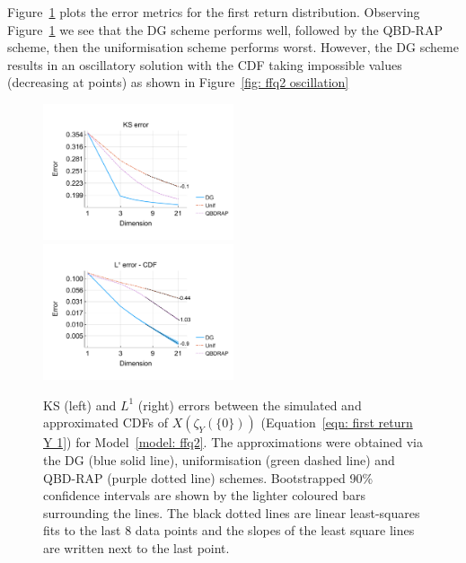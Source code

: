 Figure~\ref{fig: ffq return discts} plots the error metrics for the first return distribution. Observing Figure~\ref{fig: ffq return discts} we see that the DG scheme performs well, followed by the QBD-RAP scheme, then the uniformisation scheme performs worst. However, the DG scheme results in an oscillatory solution with the CDF taking impossible values (decreasing at points) as shown in Figure~\ref{fig: ffq2 oscillation}
\begin{figure}[h]
	\centering
	\includegraphics[width=0.5\textwidth,trim={0.75cm 0.8cm 0.25cm 1.25cm},clip]{chapter6/figs/ffq/discts/ks_error_formatted.pdf}%
	\includegraphics[width=0.5\textwidth,trim={0.75cm 0.8cm 0.25cm 1.25cm},clip]{chapter6/figs/ffq/discts/l1_cdf_error_formatted.pdf}
	\caption{KS (left) and \(L^1\) (right) errors between the simulated and approximated CDFs of \(X(\zeta_{Y}(\{0\}))\) (Equation~\ref{eqn: first return Y 1}) for Model~\ref{model: ffq2}. The approximations were obtained via the DG (blue solid line), uniformisation (green dashed line) and QBD-RAP (purple dotted line) schemes. Bootstrapped 90\% confidence intervals are shown by the lighter coloured bars surrounding the lines. The black dotted lines are linear least-squares fits to the last 8 data points and the slopes of the least square lines are written next to the last point.} 
	\label{fig: ffq return discts} 
\end{figure} 
